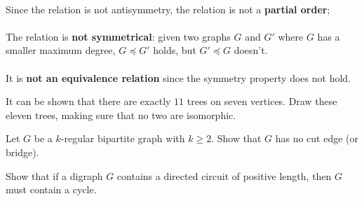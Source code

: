 \documentclass{article}
\begin{document}
\begin{exercise}
\begin{answer}
\paragraph{}Since the relation is not antisymmetry, the relation is not a \textbf{partial order};
\paragraph{}The relation is \textbf{not symmetrical}: given two graphs $G$  and $G'$ where $G$ has a smaller maximum degree, $G\preceq G'$ holds, but $G'\preceq G$ doesn't.
\paragraph{}It is \textbf{not an equivalence relation} since the symmetry property does not hold.
\end{answer}
\end{exercise}

\begin{exercise}
It can be shown that there are exactly $11$ trees on seven vertices. Draw these eleven trees, making sure that no two are isomorphic.
\begin{answer}

\end{answer}
\end{exercise}

\begin{exercise}
Let $G$ be a $k$-regular bipartite graph with $k\geq2$. Show that $G$ has no cut edge (or bridge).
\begin{answer}

\end{answer}
\end{exercise}

\begin{exercise}
Show that if a digraph $G$ contains a directed circuit of positive length, then $G$ must contain a cycle.
\begin{answer}

\end{answer}
\end{exercise}
\end{document}
